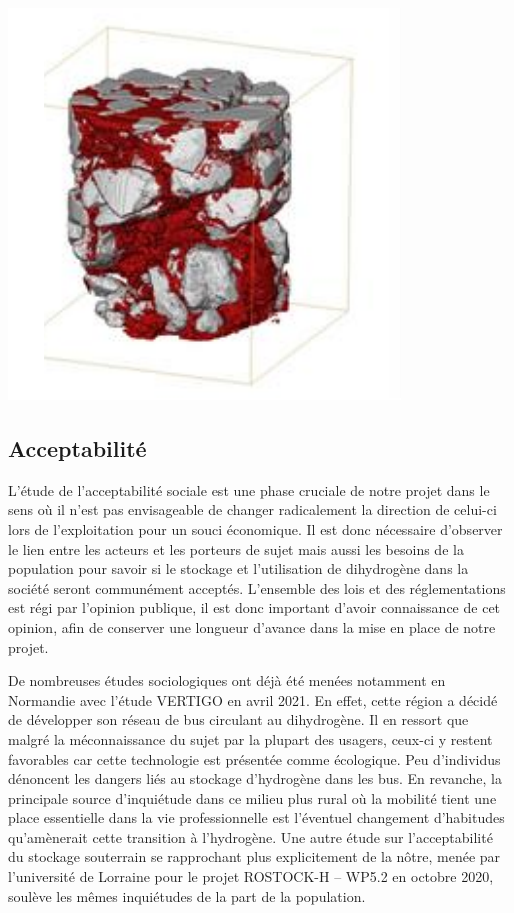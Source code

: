 \documentclass[11pt,french,a4paper]{article}
\begin{document}
\begin{multicols}{2}
\begin{center}
\includegraphics[width=0.65\linewidth]{image/chap4/colmatage.PNG}
\end{center}
\end{multicols}


\subsection{Acceptabilité}
L’étude de l’acceptabilité sociale est une phase cruciale de notre projet dans le sens où il n’est pas envisageable de changer radicalement la direction de celui-ci lors de l'exploitation pour un souci économique. Il est donc nécessaire d’observer le lien entre les acteurs et les porteurs de sujet mais aussi les besoins de la population pour savoir si le stockage et l’utilisation de dihydrogène dans la société seront communément acceptés. L’ensemble des lois et des réglementations est régi par l’opinion publique, il est donc important d’avoir connaissance de cet opinion, afin de conserver une longueur d’avance dans la mise en place de notre projet.

De nombreuses études sociologiques ont déjà été menées notamment en Normandie avec l’étude VERTIGO en avril 2021. En effet, cette région a décidé de développer son réseau de bus circulant au dihydrogène. Il en ressort que malgré la méconnaissance du sujet par la plupart des usagers, ceux-ci y restent favorables car cette technologie est présentée comme écologique. Peu d’individus dénoncent les dangers liés au stockage d’hydrogène dans les bus. En revanche, la principale source d’inquiétude dans ce milieu plus rural où la mobilité tient une place essentielle dans la vie professionnelle est l’éventuel changement d’habitudes qu’amènerait cette transition à l’hydrogène.
Une autre étude sur l’acceptabilité du stockage souterrain se rapprochant plus explicitement de la nôtre, menée par l’université de Lorraine pour le projet ROSTOCK-H – WP5.2 en octobre 2020, soulève les mêmes inquiétudes de la part de la population.
\end{document}
